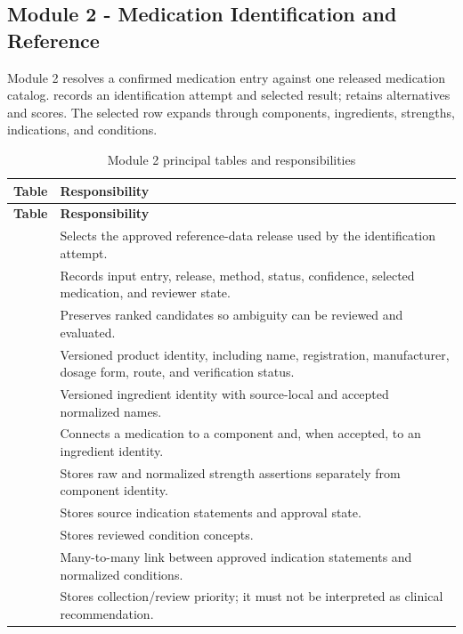 \subsection{Module 2 - Medication Identification and Reference}

Module 2 resolves a confirmed medication entry against one released medication catalog.  records an identification attempt and selected result;  retains alternatives and scores. The selected  row expands through components, ingredients, strengths, indications, and conditions.


\begin{longtable}{L{4.5cm}L{10.8cm}}
\caption{Module 2 principal tables and responsibilities}\label{tab:module2-tables}\\
\toprule
\textbf{Table} & \textbf{Responsibility}\\
\midrule
\endfirsthead
\toprule
\textbf{Table} & \textbf{Responsibility}\\
\midrule
\endhead
{} & Selects the approved reference-data release used by the identification attempt.\\
 & Records input entry, release, method, status, confidence, selected medication, and reviewer state.\\
 & Preserves ranked candidates so ambiguity can be reviewed and evaluated.\\
 & Versioned product identity, including name, registration, manufacturer, dosage form, route, and verification status.\\
 & Versioned ingredient identity with source-local and accepted normalized names.\\
 & Connects a medication to a component and, when accepted, to an ingredient identity.\\
 & Stores raw and normalized strength assertions separately from component identity.\\
 & Stores source indication statements and approval state.\\
 & Stores reviewed condition concepts.\\
 & Many-to-many link between approved indication statements and normalized conditions.\\
 & Stores collection/review priority; it must not be interpreted as clinical recommendation.\\
\bottomrule
\end{longtable}

